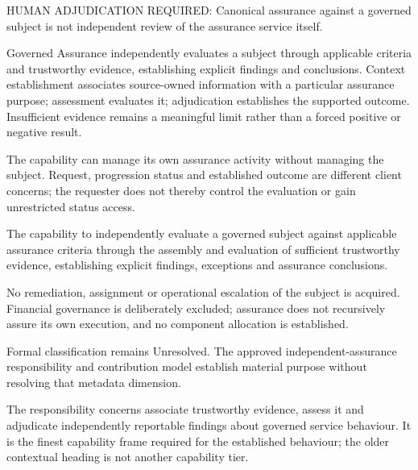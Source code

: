 HUMAN ADJUDICATION REQUIRED: Canonical assurance against a governed subject is not independent review of the assurance service itself.



Governed Assurance independently evaluates a subject through applicable criteria and trustworthy evidence, establishing explicit findings and conclusions. Context establishment associates source-owned information with a particular assurance purpose; assessment evaluates it; adjudication establishes the supported outcome. Insufficient evidence remains a meaningful limit rather than a forced positive or negative result.


The capability can manage its own assurance activity without managing the subject. Request, progression status and established outcome are different client concerns; the requester does not thereby control the evaluation or gain unrestricted status access.



The capability to independently evaluate a governed subject against applicable assurance criteria through the assembly and evaluation of sufficient trustworthy evidence, establishing explicit findings, exceptions and assurance conclusions.



No remediation, assignment or operational escalation of the subject is acquired. Financial governance is deliberately excluded; assurance does not recursively assure its own execution, and no component allocation is established.



Formal classification remains Unresolved. The approved independent-assurance responsibility and contribution model establish material purpose without resolving that metadata dimension.



The responsibility concerns associate trustworthy evidence, assess it and adjudicate independently reportable findings about governed service behaviour. It is the finest capability frame required for the established behaviour; the older contextual heading is not another capability tier.


